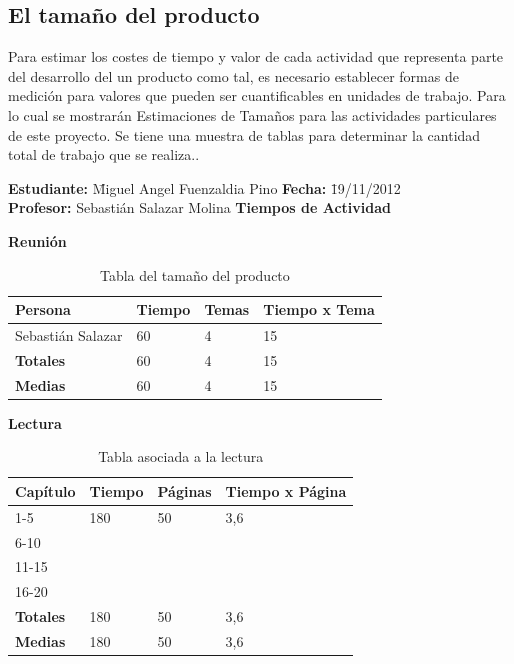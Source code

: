 \documentclass[a4paper,12pt,openany,oneside]{book}
\begin{document}
\subsection{El tamaño del producto}
Para estimar los costes de tiempo y valor de cada actividad que representa parte del desarrollo del un producto como tal, es necesario establecer formas de medición para valores que pueden ser cuantificables en unidades de trabajo. Para lo cual se mostrarán Estimaciones de Tamaños para las actividades particulares de este proyecto. Se tiene una muestra de tablas para determinar la cantidad total de trabajo que se realiza..
\newpage
\begin{table}[!ht]
\begin{tabbing}
\textbf{Estudiante:} \= Miguel Angel Fuenzaldia Pino \= \textbf{Fecha:} \= 19/11/2012\\
\textbf{Profesor:} \> Sebastián Salazar Molina \> \textbf{Tiempos de Actividad} \>  \\
\end{tabbing}
\textbf{Reunión}\\
\begin{tabular}{| l | l | l | l |}
\hline
\textbf{Persona} & \textbf{Tiempo} & \textbf{Temas} & \textbf{Tiempo x Tema}\\
\hline
Sebastián Salazar & 60 & 4 & 15\\
\hline
\textbf{Totales} & 60 & 4 & 15 \\
\hline
\textbf{Medias} & 60 & 4 & 15 \\
\hline
\end{tabular}
\caption{Tabla del tamaño del producto}
\end{table}
\begin{table}[!ht]
\textbf{Lectura}\\
\begin{tabular}{| l | l | l | l |}
\hline
\textbf{Capítulo} & \textbf{Tiempo} & \textbf{Páginas} & \textbf{Tiempo x Página}\\
\hline
1-5   & 180 & 50 & 3,6 \\
\hline
6-10  & & & \\
\hline
11-15 & & & \\
\hline
16-20 & & & \\
\hline
\textbf{Totales} & 180 & 50 & 3,6 \\
\hline
\textbf{Medias} & 180 & 50 & 3,6 \\
\hline
\end{tabular}
\caption{Tabla asociada a la lectura}
\end{table}
\end{document}
